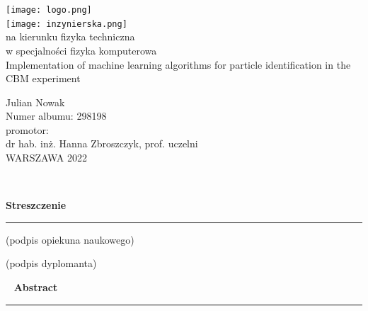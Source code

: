 \pagestyle{empty}

\begin{titlepage}
	
\begin{minipage}{\textwidth}
	\begin{center}
		\texttt{[image: logo.png]} \\
			\vspace{3cm}
		\texttt{[image: inzynierska.png]} \\ %
			\vspace{1.5cm}
  			na kierunku fizyka techniczna \\
			w specjalności fizyka komputerowa \\
			\vspace{2cm}	
		{\Large
			Implementation of machine learning algorithms for particle identification in the CBM experiment}

			\vspace{2cm}	
		{\huge
			Julian Nowak} \\
			Numer albumu: 298198 \\
			\vspace{1.5cm}	
			promotor: \\
			dr hab. inż. Hanna Zbroszczyk, prof. uczelni \\
			\vspace{3cm}
			WARSZAWA 2022		
	\end{center}
\end{minipage}

\end{titlepage}

\newpage
\mbox{ }

\newpage
{\large \textbf{Streszczenie}}\\
{\color{sliwka}\rule[1pt]{\textwidth}{1.5pt}}




\vspace{2cm}

\begin{multicols}{2}
	\begin{flushleft}
		(podpis opiekuna naukowego)
	\end{flushleft}
	\begin{flushright}
		(podpis dyplomanta)
	\end{flushright}
\end{multicols}

\newpage
\mbox{ }
\newpage
{\large \textbf{Abstract}}\\
{\color{sliwka}\rule[1pt]{\textwidth}{1.5pt}}


